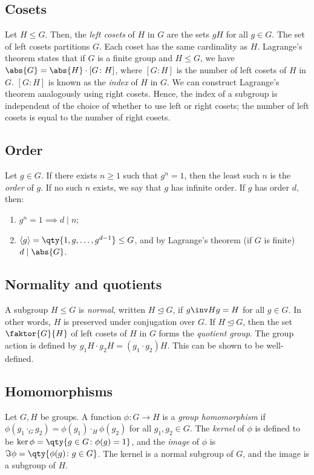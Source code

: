 \subsection{Cosets}
Let $H \leq G$.
Then, the \textit{left cosets} of $H$ in $G$ are the sets $gH$ for all $g \in G$.
The set of left cosets partitions $G$.
Each coset has the same cardinality as $H$.
Lagrange's theorem states that if $G$ is a finite group and $H \leq G$, we have $\abs{G} = \abs{H} \cdot [G \colon H]$, where $[G \colon H]$ is the number of left cosets of $H$ in $G$.
$[G \colon H]$ is known as the \textit{index} of $H$ in $G$.
We can construct Lagrange's theorem analogously using right cosets.
Hence, the index of a subgroup is independent of the choice of whether to use left or right cosets; the number of left cosets is equal to the number of right cosets.

\subsection{Order}
Let $g \in G$.
If there exists $n \geq 1$ such that $g^n = 1$, then the least such $n$ is the \textit{order} of $g$.
If no such $n$ exists, we say that $g$ has infinite order.
If $g$ has order $d$, then:
\begin{enumerate}
	\item $g^n = 1 \implies d \mid n$;
	\item $\genset{g} = \qty{1, g, \dots, g^{d-1}} \leq G$, and by Lagrange's theorem (if $G$ is finite) $d \mid \abs{G}$.
\end{enumerate}

\subsection{Normality and quotients}
A subgroup $H \leq G$ is \textit{normal}, written $H \trianglelefteq G$, if $g\inv H g = H$ for all $g \in G$.
In other words, $H$ is preserved under conjugation over $G$.
If $H \trianglelefteq G$, then the set $\faktor{G}{H}$ of left cosets of $H$ in $G$ forms the \textit{quotient group}.
The group action is defined by $g_1 H \cdot g_2 H = (g_1 \cdot g_2) H$.
This can be shown to be well-defined.

\subsection{Homomorphisms}
Let $G, H$ be groups.
A function $\phi \colon G \to H$ is a \textit{group homomorphism} if $\phi(g_1 \cdot_G g_2) = \phi(g_1) \cdot_H \phi(g_2)$ for all $g_1, g_2 \in G$.
The \textit{kernel} of $\phi$ is defined to be $\ker \phi = \qty{g \in G \colon \phi(g) = 1}$, and the \textit{image} of $\phi$ is $\Im \phi = \qty{\phi(g) \colon g \in G}$.
The kernel is a normal subgroup of $G$, and the image is a subgroup of $H$.

